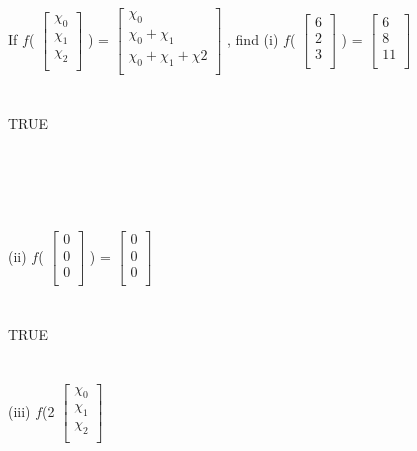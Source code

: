 \documentclass[11pt]{article}
\begin{document}
\\
\\
If $f$(
$
\begin{bmatrix}
{\chi_{0}}\\
{\chi_{1}}\\
{\chi_{2}}\\
\end{bmatrix}$
)
=
$
\begin{bmatrix}
{\chi_{0}}\\
{\chi_{0} + \chi_{1}}\\
{\chi_{0} + \chi_{1} + \chi{2}}\\
\end{bmatrix}$
,
find
(i)
$f$(
$
\begin{bmatrix}
{{6}}\\
{{2}}\\
{{3}}\\
\end{bmatrix}$
)
=
$
\begin{bmatrix}
{{6}}\\
{{8}}\\
{{11}}\\
\end{bmatrix}$
\\
\\
\\
TRUE
\\
\\
\\
\\
\\
\\
(ii)
$f$(
$
\begin{bmatrix}
{{0}}\\
{{0}}\\
{{0}}\\
\end{bmatrix}$
)
=
$
\begin{bmatrix}
{{0}}\\
{{0}}\\
{{0}}\\
\end{bmatrix}$
\\
\\
\\
TRUE
\\
\\
\\
(iii)
$f$(2
$
\begin{bmatrix}
{\chi_{0}}\\
{\chi_{1}}\\
{\chi_{2}}\\
\end{bmatrix}$
\end{document}
